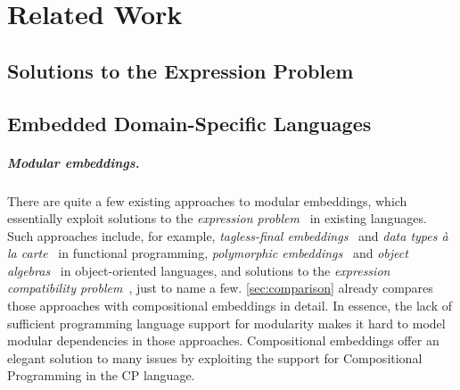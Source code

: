 \chapter{Related Work} \label{ch:related}

\section{Solutions to the Expression Problem}

\section{Embedded Domain-Specific Languages}

\paragraph{Modular embeddings.}
There are quite a few existing approaches to modular embeddings, which
essentially exploit solutions to the \emph{expression
problem}~\citep{wadler1998expression} in existing languages. Such approaches
include, for example, \emph{tagless-final embeddings}~\citep{carette2009finally}
and \emph{data types à la carte}~\citep{swierstra2008data} in functional
programming, \emph{polymorphic embeddings}~\citep{hofer2008polymorphic} and
\emph{object algebras}~\citep{oliveira2012extensibility} in object-oriented
languages, and solutions to the \emph{expression compatibility
problem}~\citep{haeri2016expression,haeri2019solving}, just to name a few.
\autoref{sec:comparison} already compares those approaches with compositional
embeddings in detail. In essence, the lack of sufficient programming language
support for modularity makes it hard to model modular dependencies in those
approaches. Compositional embeddings offer an elegant solution to many issues by
exploiting the support for Compositional Programming in the CP language.

